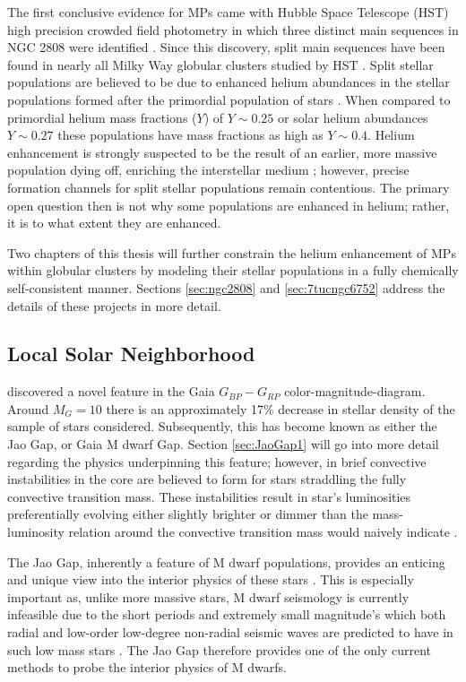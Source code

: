 The first conclusive evidence for MPs came with Hubble Space Telescope (HST)
high precision crowded field photometry in which three distinct main sequences
in NGC 2808 were identified \citep{Piotto2007}. Since this discovery, split
main sequences have been found in nearly all Milky Way globular clusters
studied by HST \citep{anderson2009,milone2011}. Split stellar populations are
believed to be due to enhanced helium abundances in the stellar populations
formed after the primordial population of stars \citep{d2005,Piotto2007}. When
compared to primordial helium mass fractions ($Y$) of $Y\sim 0.25$
\citep{collaboration2016planck} or solar helium abundances $Y\sim0.27$
\citep{vinyoles2017new} these populations have mass fractions as high as $Y\sim
0.4$. Helium enhancement is strongly suspected to be the result of an earlier,
more massive population dying off, enriching the interstellar medium
\citep{Gratton2001, Gratton2004, Gratton2012}; however, precise formation channels
for split stellar populations remain contentious. The primary open question then
is not why some populations are enhanced in helium; rather, it is to what
extent they are enhanced. 

Two chapters of this thesis will further constrain the helium enhancement of
MPs within globular clusters by modeling their stellar populations in a fully
chemically self-consistent manner. Sections \ref{sec:ngc2808} and
\ref{sec:7tucngc6752} address the details of these projects in more detail.

\subsection{Local Solar Neighborhood}
\citet{Jao2018} discovered a novel feature in the Gaia $G_{BP}-G_{RP}$
color-magnitude-diagram. Around $M_{G}=10$ there is an approximately 17\%
decrease in stellar density of the sample of stars \citeauthor{Jao2018}
considered. Subsequently, this has become known as either the Jao Gap, or Gaia
M dwarf Gap. Section \ref{sec:JaoGap1} will go into more detail regarding the
physics underpinning this feature; however, in brief convective instabilities in
the core are believed to form for stars straddling the fully convective
transition mass. These instabilities result in star's luminosities
preferentially evolving either slightly brighter or dimmer than the
mass-luminosity relation around the convective transition mass would naively
indicate \citep{Jao2020}.

The Jao Gap, inherently a feature of M dwarf populations, provides an enticing
and unique view into the interior physics of these stars \citep{Feiden2021}.
This is especially important as, unlike more massive stars, M dwarf seismology
is currently infeasible due to the short periods and extremely small
magnitude's which both radial and low-order low-degree non-radial seismic waves
are predicted to have in such low mass stars \citep{Rodriguez-Lopez2019}. The
Jao Gap therefore provides one of the only current methods to probe the
interior physics of M dwarfs.

